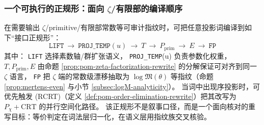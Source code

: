 \subsubsection{一个可执行的正规形：面向 \texorpdfstring{$\zeta$}{zeta}/有限部的编译顺序}
\begin{remark}\label{rem:pom-zeta-normal-form}
在需要输出 \(\zeta\)/primitive/有限部常数等可审计指纹时，可把任意投影词编译到如下“接口正规形”：
$$
\boxed{\;
\texttt{LIFT}\ \to\ \texttt{PROJ\_TEMP}(u)\ \to\ T\ \to\ P_{\mathrm{prim}}\ \to\ E\ \to\ \texttt{FP}\;}
$$
其中：
\texttt{LIFT} 选择素数轴/群扩张语义，
\texttt{PROJ\_TEMP}(u) 负责参数化权重，
\(T,P_{\mathrm{prim}},E\) 由命题 \ref{prop:pom-zeta-factorization-rewrite} 的分解保证可对齐到同一 \(\zeta\) 语言，
\texttt{FP} 把 \(\zeta\) 端的常数级漂移抽取为 \(\log\mathfrak{M}(\theta)\) 等指纹（命题 \ref{prop:mertens-even} 与小节 \ref{subsec:logM-analyticity}）。
当词中出现序投影时，可优先触发 (RCRT)（定义 \ref{def:pom-order-elimination-rewrite}）把其改写为 \(P_\chi+\mathrm{CRT}\) 的并行空间化路径。
该正规形不是叙事口径，而是一个面向核对的重写目标：等价判定在词法层归一化，在语义层用指纹族交叉核验。
\end{remark}
